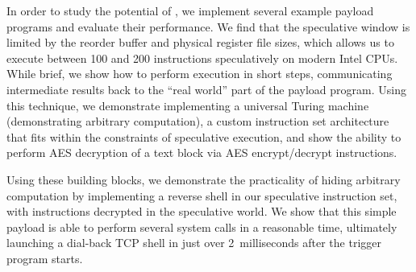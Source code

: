 In order to study the potential of \speculake, we implement several example
payload programs and evaluate their performance. We find that the speculative
window is limited by the reorder buffer and physical register file sizes, which
allows us to execute between 100 and 200 instructions speculatively on modern
Intel CPUs. While brief, we show how to perform execution in short steps,
communicating intermediate results back to the ``real world'' part of the
payload program. Using this technique, we demonstrate implementing a universal
Turing machine (demonstrating arbitrary computation), a custom instruction set
architecture that fits within the constraints of speculative execution, and show
the ability to perform AES decryption of a text block via AES encrypt/decrypt
instructions.

Using these building blocks, we demonstrate the practicality of hiding arbitrary
computation by implementing a reverse shell in our speculative instruction set,
with instructions decrypted in the speculative world.
We show that this simple payload is able to perform several system calls in a
reasonable time, ultimately launching a dial-back TCP shell in just over
2~milliseconds after the trigger program starts.










